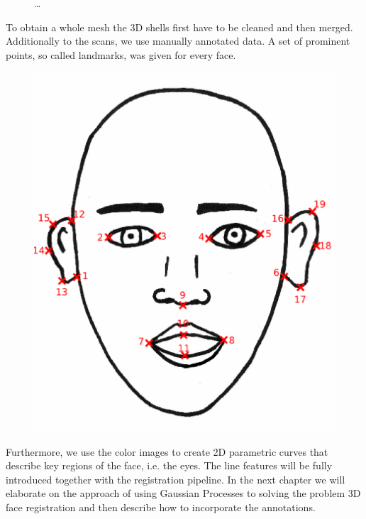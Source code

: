 \begin{figure}[h!]
\caption{\ldots}
\label{fig:scan}
\end{figure}

To obtain a whole mesh the 3D shells first have to be cleaned and then merged.
Additionally to the scans, we use manually annotated data. A set of prominent points, so called landmarks, was given for every face. 
\begin{figure}
    \centering
    \includegraphics[width=.3\textwidth]{./resources/figures/schema_marked.eps}
\end{figure}
Furthermore, we use the color images to create 2D parametric curves that describe key regions of the face, i.e. the eyes. The line features will be fully introduced together with the registration pipeline. In the next chapter we will elaborate on the approach of using Gaussian Processes to solving the problem 3D face registration and then describe how to incorporate the annotations.

